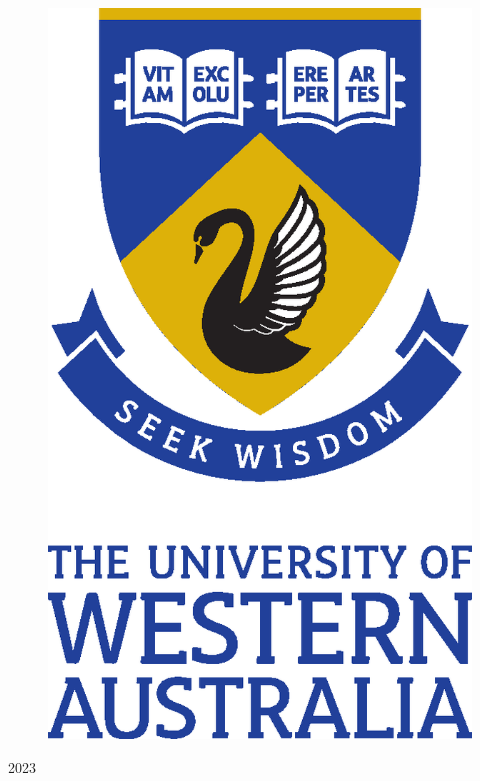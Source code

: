 \documentclass[12pt,a4paper]{report} %
\begin{document}
\begin{titlepage}
\begin{center}
        \begin{figure}[h]
            \centering{}
            \includegraphics[scale=0.6]{fig/etc/UWA_FORMAL_PORTRAIT_CMYK}
        \end{figure}

        \vspace*{\fill}
        2023
    \end{center}
\end{titlepage}


\setcounter{page}{1}
\end{document}
